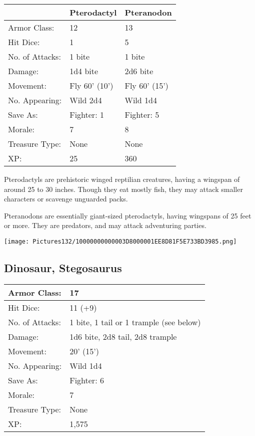 \documentclass[a4paper,twoside,openany,10pt]{book}
\begin{document}
\begin{multicols}{2}
\begin{tabularx}{0.48\textwidth}{lXX}
& Pterodactyl & Pteranodon \\\hline
Armor Class: & 12 & 13 \\\hline
Hit Dice: & 1 & 5 \\\hline
No. of Attacks: & 1 bite & 1 bite \\\hline
Damage: & 1d4 bite & 2d6 bite \\\hline
Movement: & Fly 60' (10') & Fly
60' (15') \\\hline
No. Appearing: & Wild 2d4 & Wild 1d4 \\\hline
Save As: & Fighter: 1 & Fighter: 5 \\\hline
Morale: & 7 & 8 \\\hline
Treasure Type: & None & None \\\hline
XP: & 25 & 360 \\\hline
\end{tabularx}\medskip

Pterodactyls are prehistoric winged reptilian creatures, having a wingspan of around 25 to 30 inches. Though they eat mostly fish, they may attack smaller characters or scavenge unguarded packs.

Pteranodons are essentially giant-sized pterodactyls, having wingspans of 25 feet or more. They are predators, and may attack adventuring parties.

\begin{center}
	\texttt{[image: Pictures132/10000000000003D8000001EE8D81F5E733BD3985.png]}
\end{center}

\subsection*{Dinosaur, Stegosaurus}\label{dinosaur-stegosaurus}

\begin{tabularx}{0.48\textwidth}{@{}lX@{}}
Armor Class: & 17 \\\hline
Hit Dice: & 11 (+9) \\\hline
No. of Attacks: & 1 bite, 1 tail or 1 trample (see below) \\\hline
Damage: & 1d6 bite, 2d8 tail, 2d8 trample \\\hline
Movement: & 20' (15') \\\hline
No. Appearing: & Wild 1d4 \\\hline
Save As: & Fighter: 6 \\\hline
Morale: & 7 \\\hline
Treasure Type: & None \\\hline
XP: & 1,575 \\\hline
\end{tabularx}\medskip


\end{multicols}
\end{document}
